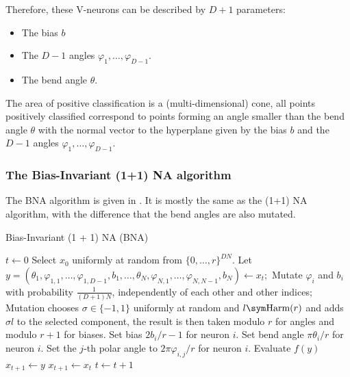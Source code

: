 Therefore, these V-neurons can be described by $D + 1$ parameters:

\begin{itemize}
    \item The bias $b$
    \item The $D - 1$ angles $\varphi_1, \ldots, \varphi_{D-1}$.
    \item The bend angle $\theta$.
\end{itemize}

The area of positive classification is a (multi-dimensional) cone, all points positively classified correspond to points forming an angle smaller than the bend
angle $\theta$ with the normal vector to the hyperplane given by the bias $b$ and the $D -1$ angles $\varphi_1, \ldots, \varphi_{D-1}$.


\subsubsection{The Bias-Invariant (1+1) NA algorithm}

The BNA algorithm is given in .
It is mostly the same as the (1+1) NA algorithm, with the difference that the bend angles are also mutated.

\begin{algorithm}
    \caption{Bias-Invariant (1 + 1) NA (BNA)}
\label{alg:bna}
\begin{algorithmic}
    \State $t \gets 0$
    \State Select $x_0$ uniformly at random from $\{0, \ldots, r\}^{DN}$.
        \State Let $y = (\theta_1, \varphi_{1,1}, \ldots, \varphi_{1,D-1}, b_1, \ldots, \theta_N, \varphi_{N,1}, \ldots, \varphi_{N,N-1}, b_N) \gets x_t;$
            \State Mutate $\varphi_i$ and $b_i$ with probability $\frac{1}{(D+1) N}$, independently of each other and other indices;
            \State Mutation chooses $\sigma \in \{-1, 1\}$ uniformly at random and $l \sym \text{Harm}(r)$ and adds $\sigma l$ to the selected component, the
            result is then taken modulo $r$ for angles and modulo $r + 1$ for biases.
                \State Set bias $2b_i / r - 1$ for neuron $i$.
                \State Set bend angle $\pi \theta_i / r$ for neuron $i$.
                    \State Set the $j$-th polar angle to $2\pi \varphi_{i,j} / r$ for neuron $i$.
                \EndFor
            \EndFor
            \State Evaluate $f(y)$
                \State $x_{t+1} \gets y$
            \Else
                \State $x_{t+1} \gets x_t$
            \EndIf
        \EndFor
        \State $t \gets t + 1$
    \EndWhile
\end{algorithmic}
\end{algorithm}


